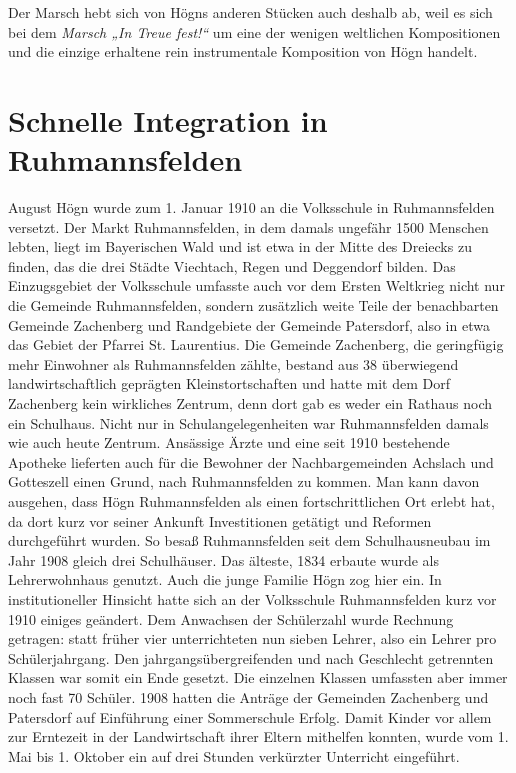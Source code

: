 \documentclass{book}
\begin{document}
Der Marsch hebt sich von Högns anderen Stücken auch deshalb ab, weil es
sich bei dem \textit{Marsch „In Treue fest!“} um eine der wenigen
weltlichen Komposi\-tionen und die einzige erhaltene rein instrumentale
Komposition von Högn handelt.

\section{Schnelle Integration in Ruhmannsfelden}

August Högn wurde zum 1. Januar 1910 an die Volksschule in
Ruhmannsfel\-den versetzt. Der Markt Ruhmannsfelden, in dem damals
ungefähr 1500 Men\-schen lebten, liegt im Bayerischen Wald und ist etwa
in der Mitte des Dreiecks zu finden, das die drei Städte Viechtach,
Regen und Deggendorf bilden. Das Einzugsgebiet der Volksschule umfasste
auch vor dem Ersten Weltkrieg nicht nur die Gemeinde Ruhmannsfelden,
sondern zusätzlich weite Teile der be\-nachbarten Gemeinde Zachenberg
und Randgebiete der Gemeinde Paters\-dorf, also in etwa das Gebiet der
Pfarrei St. Laurentius. Die Gemeinde Za\-chenberg, die geringfügig mehr
Einwohner als Ruhmannsfelden zählte, be\-stand aus 38 überwiegend
landwirtschaftlich geprägten Kleinstortschaften und hatte mit dem Dorf
Zachenberg kein wirkliches Zentrum, denn dort gab es weder ein Rathaus
noch ein Schulhaus. Nicht nur in Schulangelegenheiten war
Ruhmannsfelden damals wie auch heute Zentrum. Ansässige Ärzte und eine
seit 1910 bestehende Apotheke lieferten auch für die Bewohner der
Nach\-bargemeinden Achslach und Gotteszell einen Grund, nach
Ruhmannsfelden zu kommen. Man kann davon ausgehen, dass Högn
Ruhmannsfelden als einen fortschrittlichen Ort erlebt hat, da dort kurz
vor seiner Ankunft Investitionen getätigt und Reformen durchgeführt
wurden. So besaß Ruhmannsfelden seit dem Schulhausneubau im Jahr 1908
gleich drei Schulhäuser. Das älteste, 1834 erbaute wurde als
Lehrerwohnhaus genutzt. Auch die junge Familie Högn zog hier ein. In
institutioneller Hinsicht hatte sich an der Volksschule Ruhmannsfelden
kurz vor 1910 einiges geändert. Dem Anwachsen der Schülerzahl wurde
Rechnung getragen: statt früher vier unterrichteten nun sieben Lehrer,
also ein Lehrer pro Schülerjahrgang. Den jahrgangsübergreifenden und
nach Ge\-schlecht getrennten Klassen war somit ein Ende gesetzt. Die
einzelnen Klas\-sen umfassten aber immer noch fast 70 Schüler. 1908
hatten die Anträge der Gemeinden Zachenberg und Patersdorf auf
Einführung einer Sommerschule Erfolg. Damit Kinder vor allem zur
Erntezeit in der Landwirtschaft ihrer Eltern mithelfen konnten, wurde
vom 1. Mai bis 1. Oktober ein auf drei Stunden verkürzter Unterricht
eingeführt.
\end{document}
